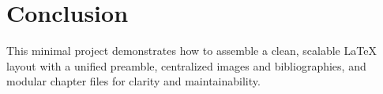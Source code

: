\documentclass[../../main.tex]{subfiles}
\begin{document}
\chapter{Conclusion}
This minimal project demonstrates how to assemble a clean, scalable LaTeX layout with a unified preamble, centralized images and bibliographies, and modular chapter files for clarity and maintainability.
\end{document}
